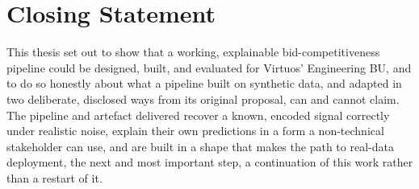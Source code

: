 \documentclass[12pt,oneside]{report}
\begin{document}
\hypertarget{closing-statement}{%
\section{Closing Statement}\label{closing-statement}}

This thesis set out to show that a working, explainable
bid-competitiveness pipeline could be designed, built, and evaluated for
Virtuos' Engineering BU, and to do so honestly about what a pipeline
built on synthetic data, and adapted in two deliberate, disclosed ways
from its original proposal, can and cannot claim. The pipeline and
artefact delivered recover a known, encoded signal correctly under
realistic noise, explain their own predictions in a form a non-technical
stakeholder can use, and are built in a shape that makes the path to
real-data deployment, the next and most important step, a continuation
of this work rather than a restart of it.
\end{document}
